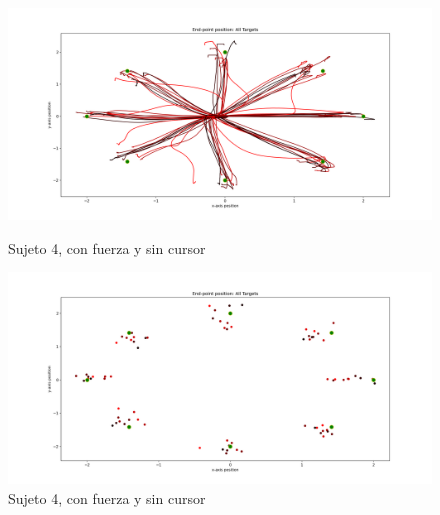\documentclass[a4paper,11pt, oneside]{book}
\begin{document}
\begin{figure}[H]
	\begin{minipage}[b]{0.5\linewidth}
		\centering
		\includegraphics[width=\linewidth]{sujeto4/force_no_cursor/trayectorias}
		\caption{Sujeto 4, con fuerza y sin cursor}
		\label{4-fase4-1}
	\end{minipage}
	\hspace{0.5cm}
	\begin{minipage}[b]{0.5\linewidth}
		\centering
		\includegraphics[width=\linewidth]{sujeto4/force_no_cursor/trayectorias_puntos}
		\caption{Sujeto 4, con fuerza y sin cursor}
		\label{4-fase4-2}
	\end{minipage}
\end{figure}
\end{document}
